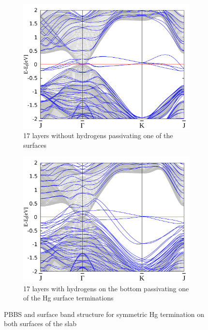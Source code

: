 \begin{figure}[htbp]
\begin{subfigure}[c]{.48\linewidth}
			\includegraphics[width=\linewidth]{Hg_termination/no_H_bulk+17_layers_no_dos_-2_2.pdf}
			\caption{17 layers without hydrogens passivating one of the surfaces} \label{}
		\end{subfigure}
		\hfill
		\begin{subfigure}[c]{.48\linewidth}
			\centering
			\includegraphics[width=\linewidth]{Hg_termination/bulk+17_layers_no_dos_-2_2.pdf}
			\caption{17 layers with hydrogens on the bottom passivating one of the Hg surface terminations}
		\end{subfigure}
		\caption{PBBS and surface band structure for symmetric Hg termination on both surfaces of the slab} 
		\label{bulk+surface_odd_layers_Hg}
	\end{figure}